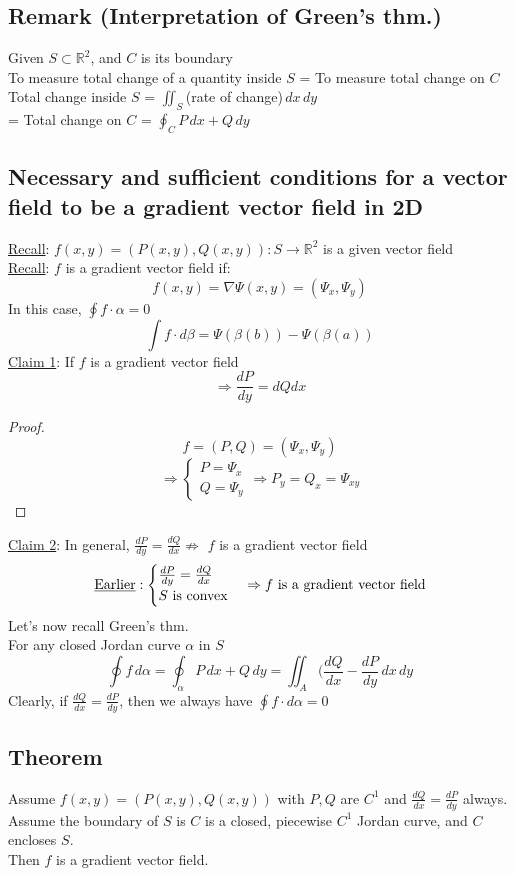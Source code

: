 \documentclass[12pt]{article}
\newcommand{\BR}{\mathbb R}
\begin{document}
    \subsection*{Remark (Interpretation of Green's thm.)}
        Given $S\subset\BR^2$, and $C$ is its boundary \\
        To measure total change of a quantity inside $S$ = To measure total change on $C$ \\
        Total change inside $S$ = $\iint_S$(rate of change)$\,dx\,dy$ \\
        = Total change on $C$ = $\oint_CP\,dx+Q\,dy$ \\
    \subsection*{Necessary and sufficient conditions for a vector field to be a gradient vector field in 2D}
        \underline{Recall}: $f(x,y)=(P(x,y),Q(x,y)):S\rightarrow\BR^2$ is a given vector field \\
        \underline{Recall}: $f$ is a gradient vector field if: \\
        \[ f(x,y)=\nabla\Psi(x,y)=(\Psi_x,\Psi_y) \]
        In this case, $\oint f\cdot\alpha=0$ \\
        \[ \int f\cdot d\beta = \Psi(\beta(b))-\Psi(\beta(a)) \]
        \underline{Claim 1}: If $f$ is a gradient vector field \\
        \[ \Rightarrow \frac{dP}{dy}={dQ}{dx} \]
        \begin{proof}
            \[f=(P,Q)=(\Psi_x,\Psi_y) \]
            \[ 
                \Rightarrow
                \begin{cases}
                    P=\Psi_x \\
                    Q=\Psi_y
                \end{cases}
                \Rightarrow P_y=Q_x=\Psi_{xy}
            \]
        \end{proof}
        \underline{Claim 2}: In general, $\frac{dP}{dy}=\frac{dQ}{dx}\not\Rightarrow$ $f$ is a gradient vector field \\
        \[
            \text{\underline{Earlier}}:
            \begin{cases}
                \frac{dP}{dy}=\frac{dQ}{dx} \\
                \text{$S$ is convex}
            \end{cases} 
            \Rightarrow f \text{ is a gradient vector field} 
        \]
        Let's now recall Green's thm. \\
        For any closed Jordan curve $\alpha$ in $S$ \\
        \[ \oint f\,d\alpha = \oint_\alpha P\,dx+Q\,dy = \iint_A(\frac{dQ}{dx}-\frac{dP}{dy}\,dx\,dy \]
        Clearly, if $\frac{dQ}{dx}=\frac{dP}{dy}$, then we always have $\oint f\cdot d\alpha=0$ \\
    \subsection*{Theorem}
        Assume $f(x,y)=(P(x,y),Q(x,y))$ with $P,Q$ are $C^1$ and $\frac{dQ}{dx}=\frac{dP}{dy}$ always. \\
        Assume the boundary of $S$ is $C$ is a closed, piecewise $C^1$ Jordan curve, and $C$ encloses $S$. \\
        Then $f$ is a gradient vector field. \\
\end{document}
